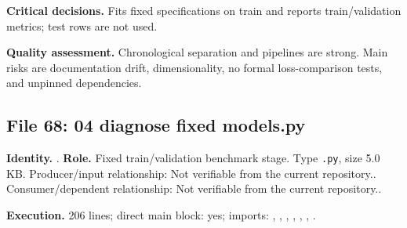 \documentclass[
  11pt,
  a4paper]{article}
\begin{document}
\textbf{Critical decisions.} Fits fixed specifications on train and
reports train/validation metrics; test rows are not used.

\textbf{Quality assessment.} Chronological separation and pipelines are
strong. Main risks are documentation drift, dimensionality, no formal
loss-comparison tests, and unpinned dependencies.

\subsection{File 68: 04 diagnose fixed
models.py}\label{file-7633895757620554582}

\textbf{Identity.}
.
\textbf{Role.} Fixed train/validation benchmark stage. Type
\texttt{.py}, size 5.0 KB. Producer/input relationship: Not verifiable
from the current repository.. Consumer/dependent relationship: Not
verifiable from the current repository..

\textbf{Execution.} 206 lines; direct main block: yes; imports:
, , ,
,
,
, .
\end{document}
